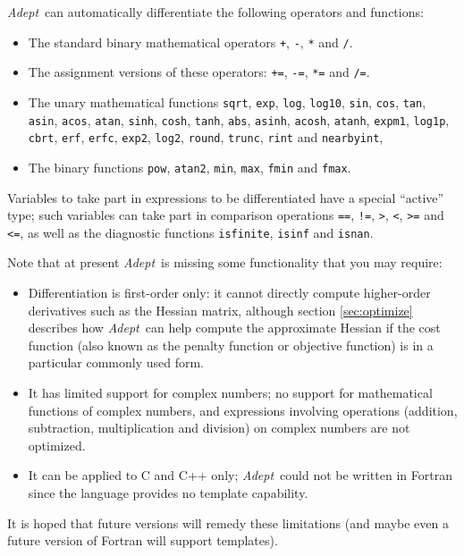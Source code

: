 \documentclass[a4,oneside]{book}
\def\codesize{\small}
\def\Adept{\emph{Adept}}
\def\code#1{{\codesize\texttt{#1}}}
\begin{document}
%
\Adept\ can automatically differentiate the following
operators and functions:
\begin{itemize}
\item The standard binary mathematical operators \code{+}, \code{-},
  \code{*} and \code{/}.
\item The assignment versions of these operators:
  \code{+=}, \code{-=}, \code{*=} and \code{/=}.
\item The unary mathematical functions \code{sqrt}, \code{exp},
  \code{log}, \code{log10}, \code{sin}, \code{cos}, \code{tan},
  \code{asin}, \code{acos}, \code{atan}, \code{sinh}, \code{cosh},
  \code{tanh}, \code{abs}, \code{asinh}, \code{acosh}, \code{atanh},
  \code{expm1}, \code{log1p}, \code{cbrt}, \code{erf}, \code{erfc},
  \code{exp2}, \code{log2}, \code{round}, \code{trunc}, \code{rint}
  and \code{nearbyint},
\item The binary functions \code{pow}, \code{atan2}, \code{min},
  \code{max}, \code{fmin} and \code{fmax}.
\end{itemize}
Variables to take part in expressions to be differentiated have a
special ``active'' type; such variables can take part in comparison
operations \code{==}, \code{!=}, \code{>}, \code{<}, \code{>=} and
\code{<=}, as well as the diagnostic functions \code{isfinite},
\code{isinf} and \code{isnan}.

Note that at present \Adept\ is missing some functionality that you may
require:

\begin{itemize}
\item Differentiation is first-order only: it cannot directly compute
  higher-order derivatives such as the Hessian matrix, although
  section \ref{sec:optimize} describes how \Adept\ can help compute
  the approximate Hessian if the cost function (also known as the
  penalty function or objective function) is in a particular commonly
  used form.
\item It has limited support for complex numbers; no support for
  mathematical functions of complex numbers, and expressions involving
  operations (addition, subtraction, multiplication and division) on
  complex numbers are not optimized.
\item It can be applied to C and C++ only; \Adept\ could not be
  written in Fortran since the language provides no template
  capability.
\end{itemize}%
%
It is hoped that future versions will remedy these limitations (and
maybe even a future version of Fortran will support templates).
\end{document}
